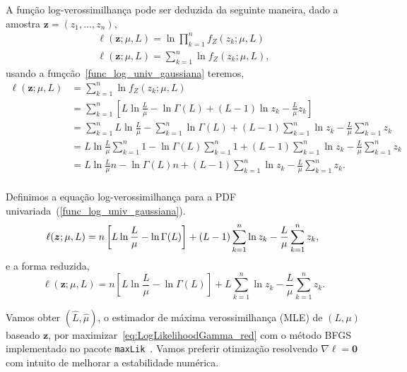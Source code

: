 A função log-verossimilhança pode ser deduzida da seguinte maneira, dado a amostra $\bm z = (z_1,\dots,z_n)$, 
\begin{equation}\nonumber
\begin{split}
  \ell(\bm z;\mu, L)=\ln\prod_{k=1}^{n}f_Z(z_k;\mu,L)\\
  \ell(\bm z;\mu, L)=\sum_{k=1}^{n}\ln f_Z(z_k;\mu,L),
 \end{split}
 \end{equation}
usando a funçcão~\eqref{func_log_univ_gaussiana} teremos,
\begin{equation}\nonumber
\begin{split}
    \ell(\bm z;\mu, L)&=\sum_{k=1}^{n}\ln f_Z(z_k;\mu,L)\\
                      &=\sum_{k=1}^{n}\left[L\ln\frac{L}{\mu}-\ln\Gamma(L)+(L-1)\ln z_k - \frac{L}{\mu} z_k\right]\\
                      &=\sum_{k=1}^{n}L\ln\frac{L}{\mu}-\sum_{k=1}^{n}\ln\Gamma(L)+(L-1)\sum_{k=1}^{n}\ln z_k - \frac{L}{\mu}\sum_{k=1}^{n} z_k\\
                      &=L\ln\frac{L}{\mu}\sum_{k=1}^{n}1-\ln\Gamma(L)\sum_{k=1}^{n}1+(L-1)\sum_{k=1}^{n}\ln z_k - \frac{L}{\mu}\sum_{k=1}^{n} z_k\\
                      &=L\ln\frac{L}{\mu}n-\ln\Gamma(L)n+(L-1)\sum_{k=1}^{n}\ln z_k - \frac{L}{\mu}\sum_{k=1}^{n} z_k.\\                
 \end{split}
 \end{equation}

Definimos a equação log-verossimilhança para a PDF univariada~(\ref{func_log_univ_gaussiana}).
\begin{equation}\nonumber
    \ell(\bm z;\mu, L)=n\left[L\ln\frac{L}{\mu}-\ln\Gamma(L)\right]+(L-1)\sum_{k=1}^{n}\ln z_k - \frac{L}{\mu}\sum_{k=1}^{n} z_k,\\                
 \end{equation}
e a forma reduzida, 
\begin{equation}
\ell(\bm z;\mu, L) = 
n \left[L\ln \frac{L}{\mu} - \ln \Gamma(L)\right]
+L \sum_{k=1}^{n}\ln z_k -\frac{L}{\mu}\sum_{k=1}^{n} z_k.
\label{eq:LogLikelihoodGamma_red}
\end{equation}


Vamos obter $(\widehat L, \widehat \mu)$, o estimador de máxima verossimilhança (MLE) de $(L, \mu)$ baseado $\bm z$, por maximizar~\eqref{eq:LogLikelihoodGamma_red} com o método BFGS implementado no pacote \texttt{maxLik}~\citep{ht}. Vamos preferir otimização resolvendo $\nabla\ell=\bm 0$ com intuito de melhorar a estabilidade numérica.

